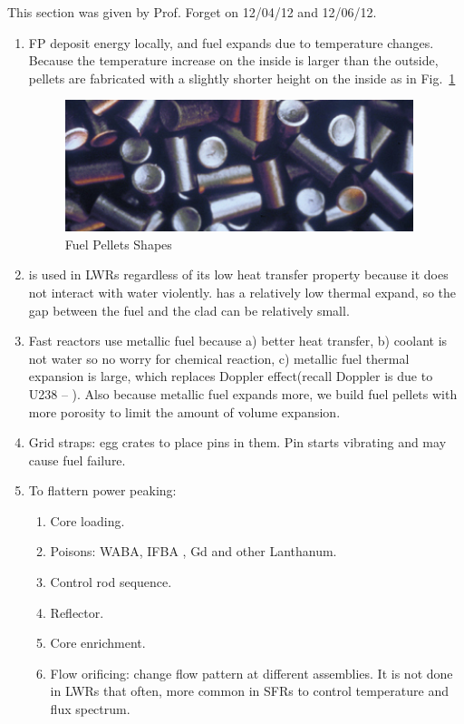 \documentclass{school-22.211-notes}
\begin{document}
\clearpage
{}
This section was given by Prof. Forget on 12/04/12 and 12/06/12. 
\begin{enumerate}
\item FP deposit energy locally, and fuel expands due to temperature changes. Because the temperature increase on the inside is larger than the outside, pellets are fabricated with a slightly shorter height on the inside as in Fig.~\ref{fuel_pellets}
\begin{figure}[ht]
  \centering
  \includegraphics[width=4in]{images/dfs/fuel_pellets.png}
  \caption{Fuel Pellets Shapes} \label{fuel_pellets}
\end{figure}


\item {} is used in LWRs regardless of its low heat transfer property because it does not interact with water violently.  has a relatively low thermal expand, so the gap between the fuel and the clad can be relatively small. 

\item Fast reactors use metallic fuel because a) better heat transfer, b) coolant is not water so no worry for chemical reaction, c) metallic fuel thermal expansion is large, which replaces Doppler effect(recall Doppler is due to U238 -- ). Also because metallic fuel expands more, we build fuel pellets with more porosity to limit the amount of volume expansion. 

\item Grid straps: egg crates to place pins in them. Pin starts vibrating and may cause fuel failure. 

\item To flattern power peaking: 
  \begin{enumerate}
  \item Core loading. 
  \item Poisons: WABA, IFBA , Gd and other Lanthanum. 
  \item Control rod sequence. 
  \item Reflector. 
  \item Core enrichment. 
  \item Flow orificing: change flow pattern at different assemblies. It is not done in LWRs that often, more common in SFRs to control temperature and flux spectrum. 
  \end{enumerate}


\end{enumerate}
\end{document}
